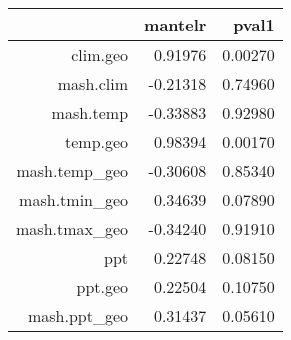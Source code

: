 \begin{table}[ht]
\centering
\begin{tabular}{rrr}
  \hline
 & mantelr & pval1 \\ 
  \hline
clim.geo & 0.91976 & 0.00270 \\ 
  mash.clim & -0.21318 & 0.74960 \\ 
  mash.temp & -0.33883 & 0.92980 \\ 
  temp.geo & 0.98394 & 0.00170 \\ 
  mash.temp\_geo & -0.30608 & 0.85340 \\ 
  mash.tmin\_geo & 0.34639 & 0.07890 \\ 
  mash.tmax\_geo & -0.34240 & 0.91910 \\ 
  ppt & 0.22748 & 0.08150 \\ 
  ppt.geo & 0.22504 & 0.10750 \\ 
  mash.ppt\_geo & 0.31437 & 0.05610 \\ 
   \hline
\end{tabular}
\end{table}
